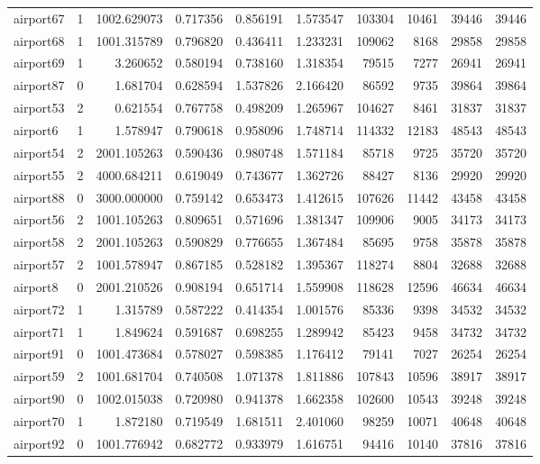 \documentclass[../../../thesis.tex]{subfiles}
\begin{document}
\begin{longtable}{|l|r|r|r|r|r|r|r|r|r|}
airport67 & 1 & 1002.629073 & 0.717356 & 0.856191 & 1.573547 & 103304 & 10461 & 39446 & 39446 \\
airport68 & 1 & 1001.315789 & 0.796820 & 0.436411 & 1.233231 & 109062 & 8168 & 29858 & 29858 \\
airport69 & 1 & 3.260652 & 0.580194 & 0.738160 & 1.318354 & 79515 & 7277 & 26941 & 26941 \\
airport87 & 0 & 1.681704 & 0.628594 & 1.537826 & 2.166420 & 86592 & 9735 & 39864 & 39864 \\
airport53 & 2 & 0.621554 & 0.767758 & 0.498209 & 1.265967 & 104627 & 8461 & 31837 & 31837 \\
airport6 & 1 & 1.578947 & 0.790618 & 0.958096 & 1.748714 & 114332 & 12183 & 48543 & 48543 \\
airport54 & 2 & 2001.105263 & 0.590436 & 0.980748 & 1.571184 & 85718 & 9725 & 35720 & 35720 \\
airport55 & 2 & 4000.684211 & 0.619049 & 0.743677 & 1.362726 & 88427 & 8136 & 29920 & 29920 \\
airport88 & 0 & 3000.000000 & 0.759142 & 0.653473 & 1.412615 & 107626 & 11442 & 43458 & 43458 \\
airport56 & 2 & 1001.105263 & 0.809651 & 0.571696 & 1.381347 & 109906 & 9005 & 34173 & 34173 \\
airport58 & 2 & 2001.105263 & 0.590829 & 0.776655 & 1.367484 & 85695 & 9758 & 35878 & 35878 \\
airport57 & 2 & 1001.578947 & 0.867185 & 0.528182 & 1.395367 & 118274 & 8804 & 32688 & 32688 \\
airport8 & 0 & 2001.210526 & 0.908194 & 0.651714 & 1.559908 & 118628 & 12596 & 46634 & 46634 \\
airport72 & 1 & 1.315789 & 0.587222 & 0.414354 & 1.001576 & 85336 & 9398 & 34532 & 34532 \\
airport71 & 1 & 1.849624 & 0.591687 & 0.698255 & 1.289942 & 85423 & 9458 & 34732 & 34732 \\
airport91 & 0 & 1001.473684 & 0.578027 & 0.598385 & 1.176412 & 79141 & 7027 & 26254 & 26254 \\
airport59 & 2 & 1001.681704 & 0.740508 & 1.071378 & 1.811886 & 107843 & 10596 & 38917 & 38917 \\
airport90 & 0 & 1002.015038 & 0.720980 & 0.941378 & 1.662358 & 102600 & 10543 & 39248 & 39248 \\
airport70 & 1 & 1.872180 & 0.719549 & 1.681511 & 2.401060 & 98259 & 10071 & 40648 & 40648 \\
airport92 & 0 & 1001.776942 & 0.682772 & 0.933979 & 1.616751 & 94416 & 10140 & 37816 & 37816 \\

\end{longtable}
\end{document}
